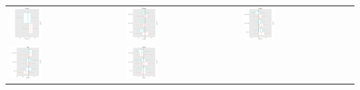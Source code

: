 \documentclass[a4paper]{article}
\begin{document}
               	
          \begin{table}[ht]
          	\centering
          	\begin{tabular}{lll}
          		\includegraphics[width = 0.3\textwidth]{plots/VanceIntercept-1.png} &
          		\includegraphics[width = 0.3\textwidth]{plots/VanceOutdegree-1.png} &
          		\includegraphics[width = 0.3\textwidth]{plots/VanceIndegree-1.png} \\
          		\includegraphics[width = 0.3\textwidth]{plots/VanceBSend-1.png} &
          		\includegraphics[width = 0.3\textwidth]{plots/VanceBReceive-1.png} &

\end{tabular}
\end{table}
\end{document}
